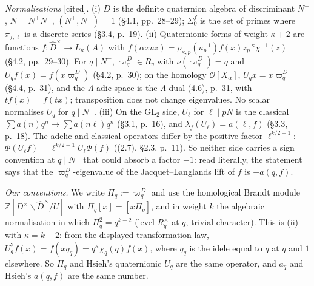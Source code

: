 \documentclass[11pt]{amsart}
\theoremstyle{plain}
\theoremstyle{remark}
\newcommand{\Z}{\mathbb{Z}}
\newcommand{\GL}{\mathrm{GL}}
\newcommand{\st}[1]{\textup{\textsf{[#1]}}}
\begin{document}
\emph{Normalisations} \st{cited}. (i) $D$ is the definite quaternion algebra of discriminant $N^-$, $N=N^+N^-$,
$(N^+,N^-)=1$ (\S4.1, pp.~28--29); $\Sigma^f_0$ is the set of primes where $\pi_{f,\ell}$ is a discrete series (\S3.4,
p.~19). (ii) Quaternionic forms of weight $\kappa+2$ are functions $f:\widehat D^\times\to L_\kappa(A)$ with
$f(\alpha xuz)=\rho_{\kappa,p}(u_p^{-1})f(x)z_p^{-\kappa}\chi^{-1}(z)$ (\S4.2, pp.~29--30). For $q\mid N^-$,
$\varpi^D_q\in R_q$ with $\nu(\varpi^D_q)=q$ and $U_qf(x)=f(x\varpi^D_q)$ (\S4.2, p.~30); on the homology
$\mathcal O[X_\alpha]$, $U_qx=x\varpi^D_q$ (\S4.4, p.~31), and the $\Lambda$-adic space is the $\Lambda$-dual
(4.6), p.~31, with $tf(x)=f(tx)$; transposition does not change eigenvalues. No scalar normalises $U_q$ for $q\mid N^-$.
(iii) On the $\GL_2$ side, $U_\ell$ for $\ell\mid pN$ is the classical $\sum a(n)q^n\mapsto\sum a(n\ell)q^n$ (\S3.1, p.~16),
and $\lambda_f(U_\ell)=a(\ell,f)$ (\S3.3, p.~18). The adelic and classical operators differ by the positive factor
$\ell^{k/2-1}$: $\Phi(U_\ell f)=\ell^{k/2-1}U_\ell\Phi(f)$ ((2.7), \S2.3, p.~11). So neither side carries a sign
convention at $q\mid N^-$ that could absorb a factor $-1$: read literally, the statement says that the
$\varpi^D_q$-eigenvalue of the Jacquet--Langlands lift of $f$ is $-a(q,f)$.

\emph{Our conventions.} We write $\Pi_q:=\varpi^D_q$ and use the homological Brandt module $\Z[D^\times\backslash\widehat
D^\times/U]$ with $\Pi_q[x]=[x\Pi_q]$, and in weight $k$ the algebraic normalisation in which $\Pi_q^2=q^{k-2}$ (level $R_q^\times$ at $q$, trivial
character). This is (ii) with $\kappa=k-2$: from the displayed
transformation law, $U_q^2f(x)=f(xq_q)=q^{\kappa}\chi_q(q)f(x)$, where $q_q$ is the idele equal to $q$ at $q$ and $1$
elsewhere. So $\Pi_q$ and Hsieh's quaternionic $U_q$ are the same operator, and $a_q$ and Hsieh's $a(q,f)$ are the same
number.
\end{document}
